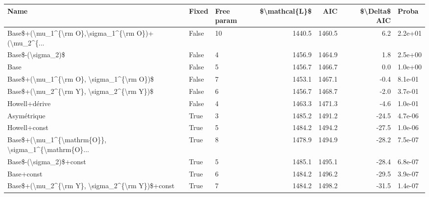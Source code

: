\begin{tabular}{lllrrrl}
\toprule
                                              Name & Fixed & Free param &  \$\textbackslash mathcal\{L\}\$ &    AIC &  \$\textbackslash Delta\$ AIC &   Proba \\
\midrule
Base\$+(\textbackslash mu\_1\textasciicircum \{\textbackslash rm O\},\textbackslash sigma\_1\textasciicircum \{\textbackslash rm O\})+(\textbackslash mu\_2\textasciicircum \{... & False &         10 &         1440.5 & 1460.5 &           6.2 & 2.2e+01 \\
                                 Base\$-(\textbackslash sigma\_2)\$ & False &          4 &         1456.9 & 1464.9 &           1.8 & 2.5e+00 \\
                                              Base & False &          5 &         1456.7 & 1466.7 &           0.0 & 1.0e+00 \\
          Base\$+(\textbackslash mu\_1\textasciicircum \{\textbackslash rm O\}, \textbackslash sigma\_1\textasciicircum \{\textbackslash rm O\})\$ & False &          7 &         1453.1 & 1467.1 &          -0.4 & 8.1e-01 \\
          Base\$+(\textbackslash mu\_2\textasciicircum \{\textbackslash rm Y\}, \textbackslash sigma\_2\textasciicircum \{\textbackslash rm Y\})\$ & False &          6 &         1456.7 & 1468.7 &          -2.0 & 3.7e-01 \\
                                     Howell+dérive & False &          4 &         1463.3 & 1471.3 &          -4.6 & 1.0e-01 \\
                                       Asymétrique &  True &          3 &         1485.2 & 1491.2 &         -24.5 & 4.7e-06 \\
                                      Howell+const &  True &          5 &         1484.2 & 1494.2 &         -27.5 & 1.0e-06 \\
Base\$+(\textbackslash mu\_1\textasciicircum \{\textbackslash mathrm\{O\}\}, \textbackslash sigma\_1\textasciicircum \{\textbackslash mathrm\{O\}... &  True &          8 &         1478.9 & 1494.9 &         -28.2 & 7.5e-07 \\
                           Base\$-(\textbackslash sigma\_2)\$+const &  True &          5 &         1485.1 & 1495.1 &         -28.4 & 6.8e-07 \\
                                        Base+const &  True &          6 &         1484.2 & 1496.2 &         -29.5 & 3.9e-07 \\
    Base\$+(\textbackslash mu\_2\textasciicircum \{\textbackslash rm Y\}, \textbackslash sigma\_2\textasciicircum \{\textbackslash rm Y\})\$+const &  True &          7 &         1484.2 & 1498.2 &         -31.5 & 1.4e-07 \\

\end{tabular}
